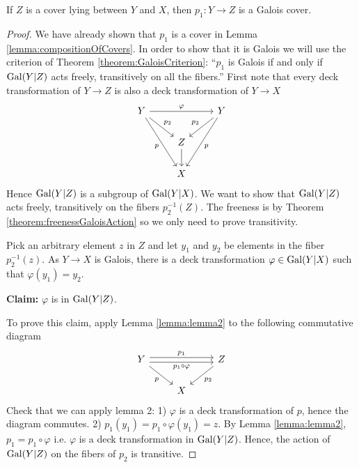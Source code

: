 \begin{proposition}
  If $Z$ is a cover lying between $Y$ and $X$, then $p_1: Y \rightarrow Z$ is a Galois cover.
\end{proposition}
\begin{proof}
  We have already shown that $p_1$ is a cover in Lemma \ref{lemma:compositionOfCovers}.
  In order to show that it is Galois we will use the criterion of Theorem \ref{theorem:GaloisCriterion}:
  ``$p_1$ is Galois if and only if $\operatorname{Gal}(Y|Z)$ acts freely, transitively on all the fibers.''
  First note that every deck transformation of $Y \rightarrow Z$ is also a deck transformation of $Y \rightarrow X$
  \begin{equation*}
    \begin{tikzcd}
      Y \ar[rr, "\varphi"] \ar[rd, "p_2"] \ar[rdd, "p"']
      & & Y \ar[ld,"p_2"'] \ar[ldd, "p"]\\
      & Z \ar[d] \\
      & X
    \end{tikzcd}
  \end{equation*}
  Hence $\operatorname{Gal}(Y|Z)$ is a subgroup of $\operatorname{Gal}(Y|X)$.
  We want to show that $\operatorname{Gal}(Y|Z)$ acts freely, transitively on the fibers $p_2^{-1}(Z)$.
  The freeness is by Theorem \ref{theorem:freenessGaloisAction} so we only need to prove transitivity.

  Pick an arbitrary element $z$ in $Z$ and let $y_1$ and $y_2$ be elements in the fiber $p_2^{-1}(z)$.
  As $Y \rightarrow X$ is Galois, there is a deck transformation $\varphi \in \operatorname{Gal}(Y|X)$ such that $\varphi(y_1) = y_2$.

  \textbf{Claim:} $\varphi$ is in $\operatorname{Gal}(Y|Z)$.

  To prove this claim, apply Lemma \ref{lemma:lemma2} to the following commutative diagram
  \begin{equation*}
    \begin{tikzcd}
      Y \ar[rr, shift left, "p_1"] \ar[rr, shift right, "p_1 \circ \varphi"']  \ar[rd, "p"']
      & & Z \ar[ld,"p_2"] \\
      & X
    \end{tikzcd}
  \end{equation*}
  Check that we can apply lemma 2: 1) $\varphi$ is a deck transformation of $p$, hence the diagram commutes. 2) $p_1(y_1) = p_1 \circ \varphi(y_1) = z$.
  By Lemma \ref{lemma:lemma2}, $p_1 = p_1 \circ \varphi$ i.e. $\varphi$ is a deck transformation in $\operatorname{Gal}(Y|Z)$.
  Hence, the action of $\operatorname{Gal}(Y|Z)$ on the fibers of $p_2$ is transitive.
\end{proof}

